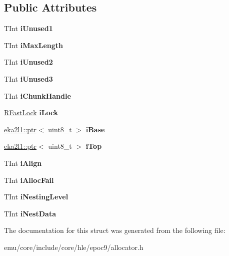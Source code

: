 \subsection*{Public Attributes}
\begin{DoxyCompactItemize}
\item 
\mbox{\label{struct_r_heap_a5d3ca6f90df673ead262af16986383d0}} 
T\+Int {\bfseries i\+Unused1}
\item 
\mbox{\label{struct_r_heap_a9d1004cbcd10bf1c7ced1e1eca3f58c7}} 
T\+Int {\bfseries i\+Max\+Length}
\item 
\mbox{\label{struct_r_heap_a96437f3264a057258452d9fc9b6c2f84}} 
T\+Int {\bfseries i\+Unused2}
\item 
\mbox{\label{struct_r_heap_adf069ccbc1f2d4d45b2c4d8df74df367}} 
T\+Int {\bfseries i\+Unused3}
\item 
\mbox{\label{struct_r_heap_a91f1337f4e22e332358ec82eba19a8b4}} 
T\+Int {\bfseries i\+Chunk\+Handle}
\item 
\mbox{\label{struct_r_heap_af699780c22dede30d0dc84f5383c1811}} 
\mbox{\hyperlink{struct_r_fast_lock}{R\+Fast\+Lock}} {\bfseries i\+Lock}
\item 
\mbox{\label{struct_r_heap_a505dc3017cf198bc72550323ece4fe1b}} 
\mbox{\hyperlink{classeka2l1_1_1ptr}{eka2l1\+::ptr}}$<$ uint8\+\_\+t $>$ {\bfseries i\+Base}
\item 
\mbox{\label{struct_r_heap_a9bdb100a801933b98c3656b3d2e4950d}} 
\mbox{\hyperlink{classeka2l1_1_1ptr}{eka2l1\+::ptr}}$<$ uint8\+\_\+t $>$ {\bfseries i\+Top}
\item 
\mbox{\label{struct_r_heap_aa33d59c6ca13e66de319ee933bfb2ea8}} 
T\+Int {\bfseries i\+Align}
\item 
\mbox{\label{struct_r_heap_ad95b655659118753f55dd3c89e6d7a91}} 
T\+Int {\bfseries i\+Alloc\+Fail}
\item 
\mbox{\label{struct_r_heap_ae5fbaba28f504cbf73aacf0c28d5455d}} 
T\+Int {\bfseries i\+Nesting\+Level}
\item 
\mbox{\label{struct_r_heap_aae1c930a9b54117e3b99342f66507b1c}} 
T\+Int {\bfseries i\+Nest\+Data}
\end{DoxyCompactItemize}


The documentation for this struct was generated from the following file\+:\begin{DoxyCompactItemize}
\item 
emu/core/include/core/hle/epoc9/allocator.\+h\end{DoxyCompactItemize}
